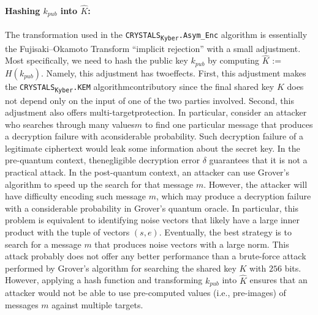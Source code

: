 \documentclass[runningheads]{llncs}
\numberwithin{equation}{section}
\begin{document}
    \paragraph{\textbf{Hashing ${k}_{pub}$ into $\hat{K}$:}} 

    The transformation used in the \texorpdfstring{\texttt{CRYSTALS}\textsubscript{\texttt{Kyber}}\texttt{.Asym\_Enc}}\/ algorithm is essentially the Fujisaki–Okamoto Transform ``implicit rejection'' \cite{fujisaki-okamoto:secure-integration-asymmetric-and-symmetric-encryption-schemes:2013:06-2024,hofheinz-hovelmanns-kiltz:modular-analysis-fujisaki-okamoto-transformation:2017:06-2024,targhi-unruh:quantum-security-fujisaki-okamoto-and-oaep-transforms:2015:06-2024} with a small adjustment. Most specifically, we need to hash the public key ${k}_{pub}$ by computing $\hat{K}$ := $H( {k}_{pub} )$. Namely, this adjustment has two\break effects. First, this adjustment makes the \texorpdfstring{\texttt{CRYSTALS}\textsubscript{\texttt{Kyber}}\texttt{.KEM}}\/ algorithm\break contributory since the final shared key $K$ does not depend only on the input of one of the two parties involved. Second, this adjustment also offers multi-target\break protection. In particular, consider an attacker who searches through many values\break $m$ to find one particular message that produces a decryption failure with a\break considerable probability. Such decryption failure of a legitimate ciphertext would leak some information about the secret key. In the pre-quantum context, the\break negligible decryption error $\delta$ guarantees that it is not a practical attack. In the post-quantum context, an attacker can use Grover's algorithm to speed up the search for that message $m$. However, the attacker will have difficulty encoding such message $m$, which may produce a decryption failure with a considerable probability in Grover's quantum oracle. In particular, this problem is equivalent to identifying noise vectors that likely have a large inner product with the tuple of vectors $(s, e)$. Eventually, the best strategy is to search for a message $m$ that produces noise vectors with a large norm. This attack probably does not offer any better performance than a brute-force attack performed by Grover's algorithm for searching the shared key $K$ with $256$ bits. However, applying a hash function and transforming ${k}_{pub}$ into $\hat{K}$ ensures that an attacker would not be able to use pre-computed values (i.e., pre-images) of messages $m$ against multiple targets.

    
    
\end{document}
